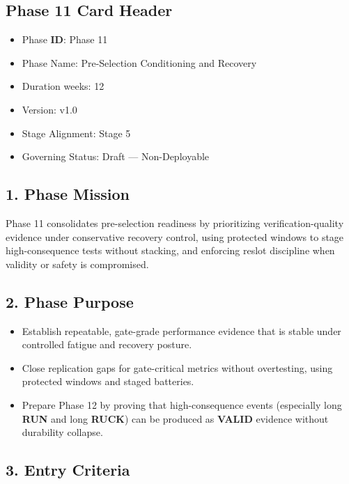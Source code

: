 \documentclass[10pt]{article}
\begin{document}
\subsection*{Phase 11 Card Header}
{}

\begin{itemize}
\item Phase \textbf{ID}: Phase 11
\item Phase Name: Pre-Selection Conditioning and Recovery
\item Duration weeks: 12
\item Version: v1.0
\item Stage Alignment: Stage 5
\item Governing Status: Draft — Non-Deployable
\end{itemize}

\subsection*{1. Phase Mission}

Phase 11 consolidates pre-selection readiness by prioritizing verification-quality evidence under conservative recovery control, using protected windows to stage high-consequence tests without stacking, and enforcing reslot discipline when validity or safety is compromised.

\subsection*{2. Phase Purpose}

\begin{itemize}
\item Establish repeatable, gate-grade performance evidence that is stable under controlled fatigue and recovery posture.
\item Close replication gaps for gate-critical metrics without overtesting, using protected windows and staged batteries.
\item Prepare Phase 12 by proving that high-consequence events (especially long \textbf{RUN} and long \textbf{RUCK}) can be produced as \textbf{VALID} evidence without durability collapse.
\end{itemize}

\subsection*{3. Entry Criteria}
\end{document}
